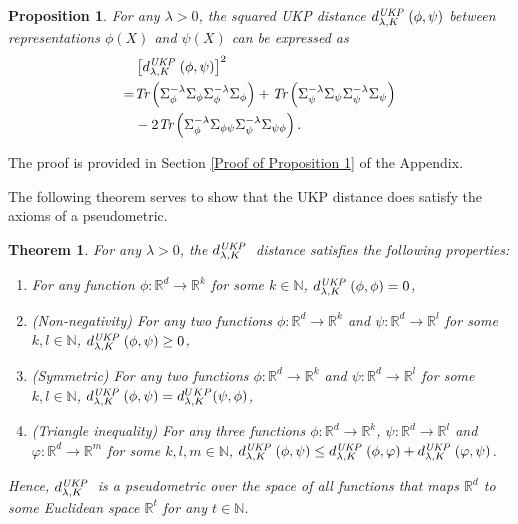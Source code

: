 \documentclass{article}
\theoremstyle{plain}
\newcounter{theoremno}
\newcounter{propositionno}
\newtheorem{theorem}[theoremno]{Theorem}
\newtheorem{proposition}[propositionno]{Proposition}
\newcommand{\R}{\mathbb{R}}
\newcommand{\N}{\mathbb{N}}
\newcommand{\repone}{\phi}
\newcommand{\reptwo}{\psi}
\newcommand{\repthree}{\varphi}
\newcommand{\metricstname}{UKP }
\begin{document}
\begin{proposition}\label{Proposition: Squared pseudometric using trace operators}
    For any $\lambda>0$, the squared \emph{\metricstname} distance $d_{\lambda,K}^{\emph{\metricstname}}(\repone,\reptwo)$ between representations $\repone(X)$ and $\reptwo(X)$ can be expressed as
    \[
\begin{aligned}
        &\left[d_{\lambda,K}^{\emph{\metricstname}}(\repone,\reptwo)\right]^{2}\\
        =& \emph{Tr}\left(\Sigma_{\repone}^{-\lambda}\Sigma_{\repone}\Sigma_{\repone}^{-\lambda}\Sigma_{\repone}\right) + \emph{Tr}\left(\Sigma_{\reptwo}^{-\lambda}\Sigma_{\reptwo}\Sigma_{\reptwo}^{-\lambda}\Sigma_{\reptwo}\right)\\
        &-2\emph{Tr}\left(\Sigma_{\repone}^{-\lambda}\Sigma_{\repone\reptwo}\Sigma_{\reptwo}^{-\lambda}\Sigma_{\reptwo\repone}\right).
    \end{aligned}
    \]
\end{proposition}

The proof is provided in Section \ref{Proof of Proposition 1} of the Appendix.

The following theorem serves to show that the \metricstname distance does satisfy the axioms of a pseudometric.

\begin{theorem}\label{Theorem: Pseudometric}
    For any $\lambda>0$, the $d_{\lambda,K}^{\emph{\metricstname}}$ distance satisfies the following properties:
    \begin{enumerate}
        \item For any function $\repone: \R^d \to \R^k$ for some $k \in \N$, $d_{\lambda,K}^{\emph{\metricstname}}(\repone,\repone) = 0$,
        \item (Non-negativity) For any two functions $\repone: \R^d \to \R^k$ and $\reptwo: \R^d \to \R^l$ for some $k,l \in \N$, $d_{\lambda,K}^{\emph{\metricstname}}(\repone,\reptwo) \geq 0$,
        \item (Symmetric) For any two functions $\repone: \R^d \to \R^k$ and $\reptwo: \R^d \to \R^l$ for some $k,l \in \N$, $d_{\lambda,K}^{\emph{\metricstname}}(\repone,\reptwo) = d_{\lambda,K}^{\metricstname}(\reptwo,\repone)$,
        \item (Triangle inequality) For any three functions $\repone: \R^d \to \R^k$, $\reptwo: \R^d \to \R^l$ and $\repthree: \R^d \to \R^m$ for some $k,l,m \in \N$, $d_{\lambda,K}^{\emph{\metricstname}}(\repone,\reptwo) \leq d_{\lambda,K}^{\emph{\metricstname}}(\repone,\repthree) + d_{\lambda,K}^{\emph{\metricstname}}(\repthree,\reptwo)$.
    \end{enumerate}
    Hence, $d_{\lambda,K}^{\emph{\metricstname}}$ is a pseudometric over the space of all functions that maps $\R^d$ to some Euclidean space $\R^t$ for any $t \in \N$.
\end{theorem}
\end{document}
